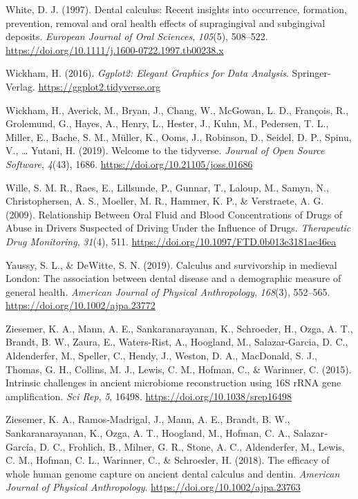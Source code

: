 \documentclass[
]{article}
\newlength{\cslhangindent}
\newenvironment{CSLReferences}[2] %
 {\begin{list}{}{%
  \setlength{\itemindent}{0pt}
  \setlength{\leftmargin}{0pt}
  \setlength{\parsep}{0pt}
  \ifodd #1
   \setlength{\leftmargin}{\cslhangindent}
   \setlength{\itemindent}{-1\cslhangindent}
  \fi
  \setlength{\itemsep}{#2\baselineskip}}}
 {\end{list}}
\begin{document}
\begin{CSLReferences}{1}{0}
White, D. J. (1997). Dental calculus: Recent insights into occurrence,
formation, prevention, removal and oral health effects of supragingival
and subgingival deposits. \emph{European Journal of Oral Sciences},
\emph{105}(5), 508--522.
\url{https://doi.org/10.1111/j.1600-0722.1997.tb00238.x}

Wickham, H. (2016). \emph{Ggplot2: {Elegant Graphics} for {Data
Analysis}}. {Springer-Verlag}. \url{https://ggplot2.tidyverse.org}

Wickham, H., Averick, M., Bryan, J., Chang, W., McGowan, L. D.,
François, R., Grolemund, G., Hayes, A., Henry, L., Hester, J., Kuhn, M.,
Pedersen, T. L., Miller, E., Bache, S. M., Müller, K., Ooms, J.,
Robinson, D., Seidel, D. P., Spinu, V., \ldots{} Yutani, H. (2019).
Welcome to the {tidyverse}. \emph{Journal of Open Source Software},
\emph{4}(43), 1686. \url{https://doi.org/10.21105/joss.01686}

Wille, S. M. R., Raes, E., Lillsunde, P., Gunnar, T., Laloup, M., Samyn,
N., Christophersen, A. S., Moeller, M. R., Hammer, K. P., \& Verstraete,
A. G. (2009). Relationship {Between Oral Fluid} and {Blood
Concentrations} of {Drugs} of {Abuse} in {Drivers Suspected} of {Driving
Under} the {Influence} of {Drugs}. \emph{Therapeutic Drug Monitoring},
\emph{31}(4), 511. \url{https://doi.org/10.1097/FTD.0b013e3181ae46ea}

Yaussy, S. L., \& DeWitte, S. N. (2019). Calculus and survivorship in
medieval {London}: {The} association between dental disease and a
demographic measure of general health. \emph{American Journal of
Physical Anthropology}, \emph{168}(3), 552--565.
\url{https://doi.org/10.1002/ajpa.23772}

Ziesemer, K. A., Mann, A. E., Sankaranarayanan, K., Schroeder, H., Ozga,
A. T., Brandt, B. W., Zaura, E., Waters-Rist, A., Hoogland, M.,
Salazar-Garcia, D. C., Aldenderfer, M., Speller, C., Hendy, J., Weston,
D. A., MacDonald, S. J., Thomas, G. H., Collins, M. J., Lewis, C. M.,
Hofman, C., \& Warinner, C. (2015). Intrinsic challenges in ancient
microbiome reconstruction using {16S rRNA} gene amplification. \emph{Sci
Rep}, \emph{5}, 16498. \url{https://doi.org/10.1038/srep16498}

Ziesemer, K. A., Ramos‐Madrigal, J., Mann, A. E., Brandt, B. W.,
Sankaranarayanan, K., Ozga, A. T., Hoogland, M., Hofman, C. A.,
Salazar‐García, D. C., Frohlich, B., Milner, G. R., Stone, A. C.,
Aldenderfer, M., Lewis, C. M., Hofman, C. L., Warinner, C., \&
Schroeder, H. (2018). The efficacy of whole human genome capture on
ancient dental calculus and dentin. \emph{American Journal of Physical
Anthropology}. \url{https://doi.org/10.1002/ajpa.23763}


\end{CSLReferences}
\end{document}
